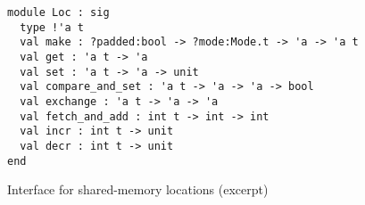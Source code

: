 \begin{figure}[tp]
\begin{verbatim}
module Loc : sig
  type !'a t
  val make : ?padded:bool -> ?mode:Mode.t -> 'a -> 'a t
  val get : 'a t -> 'a
  val set : 'a t -> 'a -> unit
  val compare_and_set : 'a t -> 'a -> 'a -> bool
  val exchange : 'a t -> 'a -> 'a
  val fetch_and_add : int t -> int -> int
  val incr : int t -> unit
  val decr : int t -> unit
end
\end{verbatim}
\caption{Interface for shared-memory locations (excerpt)}
\label{fig:loc}
\end{figure}